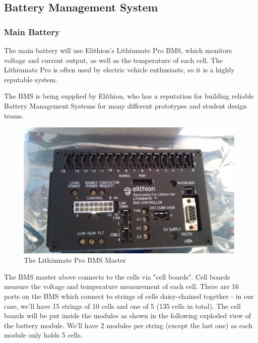 \documentclass[main.tex]{subfiles}
\begin{document}
    \subsection{Battery Management System}
    \subsubsection{Main Battery}
   	The main battery will use Elithion's Lithiumate Pro BMS, which monitors voltage and current output, as well as the temperature of each cell. The Lithiumate Pro is often used by electric vehicle enthusiasts, so it is a highly reputable system. 
    
    The BMS is being supplied by Elithion, who has a reputation for building reliable Battery Management Systems for many different prototypes and student design teams.
    

     \begin{figure}[H]
        \centering
        \includegraphics[width=\linewidth]{images/lithiumate_pro}
        \caption{The Lithiumate Pro BMS Master}
        \label{fig:bms-master}
    \end{figure}   
 
 	The BMS master above connects to the cells via "cell boards".  Cell boards measure the voltage and temperature measurement of each cell. There are 16 ports on the BMS which connect to strings of cells daisy-chained together - in our case, we'll have 15 strings of 10 cells and one of 5 (135 cells in total). The cell boards will be put inside the modules as shown in the following exploded view of the battery module. We'll have 2 modules per string (except the last one) as each module only holds 5 cells.
     
\end{document}
